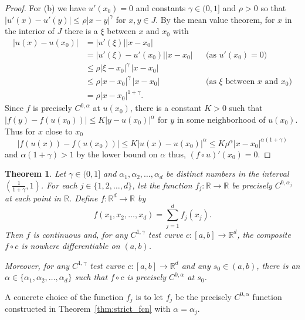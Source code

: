 \documentclass[12pt]{amsart}
\newcommand{\adj}{{precisely }} %
\numberwithin{equation}{section}
\newcommand{\R}{{\mathbb R}}		%
\newcommand{\cn}{\colon}                %
\newtheorem{thm}{Theorem}[section]
\theoremstyle{definition}
\theoremstyle{remark}
\begin{document}
\begin{proof}
For (b) we have $u'(x_0)=0$ and 
constants $\gamma\in(0,1]$ and  $\rho>0$ 
so that  $|u'(x) - u'(y)| \le \rho |x-y|^\gamma$ for  $x,y\in J$.
%
By the mean value theorem, for $x$  in the interior of $J$
there is a $\xi$ between $x$ and $x_0$ with
\allowdisplaybreaks
\begin{align*}
    |u(x)-u(x_0)|&= |u'(\xi)| |x-x_0|\\
                 &= |u'(\xi)-u'(x_0)||x-x_0|&& \text{(as $u'(x_0)=0$)}\\
                 &\le \rho |\xi - x_0|^\gamma \, |x-x_0|\\
    & \le \rho |x-x_0|^\gamma \, |x-x_0|&& \text{(as $\xi$ between $x$ and $x_0$)}\\
                & = \rho|x-x_0|^{1+\gamma}.
\end{align*}
Since $f$ is  \adj  $C^{0,\alpha}$ at $u(x_0)$, there is a constant
$K>0$ such that
$|f(y) - f(u(x_0))| \le K|y-u(x_0)|^\alpha$
for $y$ in some neighborhood of $u(x_0)$.
Thus for $x$ close to $x_0$ 
$$
|f(u(x)) - f(u(x_0))|\le K|u(x)- u(x_0)|^\alpha  \le
K\rho^\alpha |x-x_0|^{\alpha(1+\gamma)}
$$
and $\alpha(1+\gamma) >1$ by the  lower bound on  $\alpha$
thus, $(f\circ u)'(x_0)=0$.
\end{proof}

\begin{thm}\label{thm:main_example}
  Let $\gamma\in(0,1]$ and 
  $\alpha_1, \alpha_2 ,\ldots, \alpha_d$ be distinct 
  numbers in the interval $(\tfrac{1}{1+\gamma},1)$.
  For each
  $j \in \{1,2, \ldots, d\}$, let the function 
  $f_j\cn\R\to\R$ be  \adj $C^{0,\alpha_j}$
  at each point in $\R$. 
Define  $f\cn \R^d \to \R$ by 
$$
f(x_1, x_2 ,\ldots,x_d) = \sum_{j=1}^d f_j(x_j). 
$$
Then $f$ is continuous and, 
for any $C^{1,\gamma}$ test curve $c: [a,b]\to\R^d$,
the composite $f\circ c$ is nowhere differentiable on $(a,b)$.


Moreover,
for any $C^{1,\gamma}$ test curve $c\cn [a,b]\to \R^d$
and any $s_0\in (a,b)$, there
is an $\alpha \in \{ \alpha_1, \alpha_2 ,\ldots, \alpha_d\}$ such
that $f\circ c $ is \adj $C^{0,\alpha}$ at $s_0$. 
\end{thm}

A concrete choice of the function $f_j$ is to let $f_j$
be the \adj $C^{0,\alpha}$ function
constructed in Theorem~\ref{thm:strict_fcn} 
with $\alpha=\alpha_j$.
\end{document}
